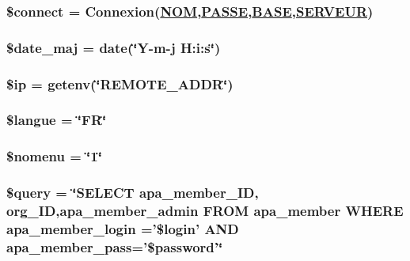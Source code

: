 \hypertarget{apa__login_8php_a0}{
\subsubsection[\$connect]{\setlength{\rightskip}{0pt plus 5cm}\$connect = Connexion(\hyperlink{pma__connect_8php_a0}{NOM},\hyperlink{pma__connect_8php_a1}{PASSE},\hyperlink{pma__connect_8php_a3}{BASE},\hyperlink{pma__connect_8php_a2}{SERVEUR})}}
\label{apa__login_8php_a0}


\hypertarget{apa__login_8php_a7}{
\subsubsection[\$date\_\-maj]{\setlength{\rightskip}{0pt plus 5cm}\$date\_\-maj = date(\char`\"{}Y-m-j H:i:s\char`\"{})}}
\label{apa__login_8php_a7}


\hypertarget{apa__login_8php_a8}{
\subsubsection[\$ip]{\setlength{\rightskip}{0pt plus 5cm}\$ip = getenv(\char`\"{}REMOTE\_\-ADDR\char`\"{})}}
\label{apa__login_8php_a8}


\hypertarget{apa__login_8php_a5}{
\subsubsection[\$langue]{\setlength{\rightskip}{0pt plus 5cm}\$langue = \char`\"{}FR\char`\"{}}}
\label{apa__login_8php_a5}


\hypertarget{apa__login_8php_a6}{
\subsubsection[\$nomenu]{\setlength{\rightskip}{0pt plus 5cm}\$nomenu = \char`\"{}1\char`\"{}}}
\label{apa__login_8php_a6}


\hypertarget{apa__login_8php_a1}{
\subsubsection[\$query]{\setlength{\rightskip}{0pt plus 5cm}\$query = \char`\"{}SELECT apa\_\-member\_\-ID, org\_\-ID,apa\_\-member\_\-admin FROM apa\_\-member WHERE apa\_\-member\_\-login ='\$login' AND apa\_\-member\_\-pass='\$password'\char`\"{}}}
\label{apa__login_8php_a1}


